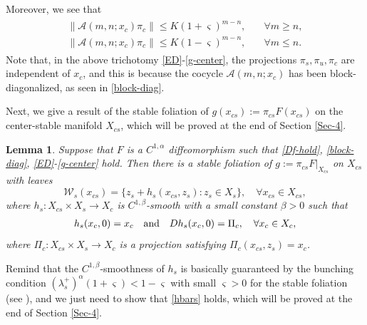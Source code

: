 \documentclass[reqno]{amsart}
\numberwithin{equation}{section}
\newtheorem{lemma}[theorem]{Lemma}
\begin{document}
Moreover,  we see that
\begin{align}\label{g-center}
\begin{split}
 \|\mathcal{A}(m,n;x_c)\pi_c\| \le K (1+\varsigma)^{m-n}, \quad & \forall m\ge n,
\\
\|\mathcal{A}(m,n;x_c)\pi_c\| \le K (1-\varsigma)^{m-n}, \quad & \forall m\le n.
\end{split}
\end{align}
Note that, in the above trichotomy \eqref{ED}-\eqref{g-center}, the projections $\pi_s,\pi_u,\pi_c$ are independent of $x_c$, and this is because the cocycle $\mathcal{A}(m,n;x_c)$ has been block-diagonalized, as seen in \eqref{block-diag}.

Next, we give a result of the stable foliation of $g(x_{cs}):=\pi_{cs}F(x_{cs})$ on the center-stable manifold $X_{cs}$, which will be proved at the end of Section \ref{Sec-4}.

\begin{lemma}\label{IF}
Suppose that $F$ is a $C^{1,\alpha}$ diffeomorphism
 such that  \eqref{Df-hold}, \eqref{block-diag}, \eqref{ED}-\eqref{g-center}  hold. Then
there is a stable foliation of $g:=\pi_{cs}F|_{X_{cs}}$ on $X_{cs}$
with leaves
$$
\mathcal{W}_s(x_{cs})=\{z_s+ h_s(x_{cs},z_s):z_s\in X_s\}, \quad \forall x_{cs}\in X_{cs},
$$
where $h_s:X_{cs} \times X_s \to X_c$ is
$C^{1,\beta}$-smooth with a small constant $\beta>0$ such that
\begin{align}\label{hbars}
h_s(x_{c},0)=x_c\quad {\rm and}\quad Dh_s(x_c,0)=\Pi_{c}, \quad \forall x_c\in X_c,
\end{align}
where %
 $\Pi_c:X_{cs}\times X_s\to X_{c}$ is a projection satisfying
$\Pi_c(x_{cs},z_s)=x_{c}$.
\end{lemma}
\noindent Remind that the $C^{1,\beta}$-smoothness of $h_s$ is basically guaranteed by the bunching condition $(\lambda_s^+)^{\alpha}(1+\varsigma)<1-\varsigma$ with small $\varsigma>0$ for the stable foliation (see \cite[Lemmas 2-3]{ZZJ-MA}), and we just need to show that \eqref{hbars} holds, which will be proved at the end of Section \ref{Sec-4}. 
\end{document}

